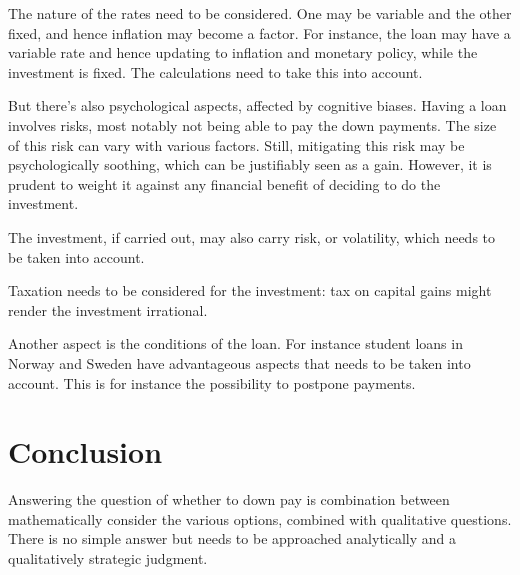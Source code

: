 \documentclass[a4paper]{article}
\begin{document}
The nature of the rates need to be considered. One may be variable and the other
fixed, and hence inflation may become a factor. For instance, the loan may have
a variable rate and hence updating to inflation and monetary policy, while the
investment is fixed. The calculations need to take this into account.

But there's also psychological aspects, affected by cognitive biases. Having a
loan involves risks, most notably not being able to pay the down payments. The
size of this risk can vary with various factors. Still, mitigating this risk may
be psychologically soothing, which can be justifiably seen as a gain. However,
it is prudent to weight it against any financial benefit of deciding to do the
investment.

The investment, if carried out, may also carry risk, or volatility, which needs
to be taken into account.

Taxation needs to be considered for the investment: tax on capital gains might
render the investment irrational.

Another aspect is the conditions of the loan. For instance student loans in
Norway and Sweden have advantageous aspects that needs to be taken into account.
This is for instance the possibility to postpone payments.

\section{Conclusion}

Answering the question of whether to down pay is combination between
mathematically consider the various options, combined with qualitative
questions. There is no simple answer but needs to be approached analytically and
a qualitatively strategic judgment.
\end{document}
